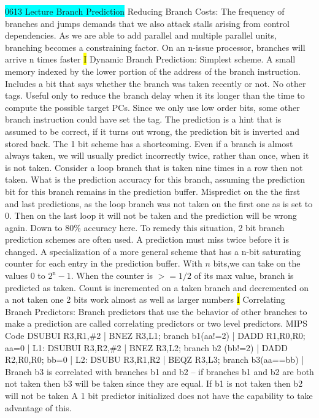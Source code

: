 \documentclass[fontsize=4pt]{scrartcl}
\begin{document}
\colorbox{Cyan}{0613 Lecture Branch Prediction} Reducing Branch Costs: The frequency of branches and jumps demands that we also attack stalls arising from control dependencies. As we are able to add parallel and multiple parallel units, branching becomes a constraining factor. On an n-issue processor, branches will arrive n times faster
\hl{I}
Dynamic Branch Prediction: Simplest scheme. A small memory indexed by the lower portion of the address of the branch instruction. Includes a bit that says whether the branch was taken recently or not. No other tags. Useful only to reduce the branch delay when it its longer than the time to compute the possible target PCs. Since we only use low order bits, some other branch instruction could have set the tag. The prediction is a hint that is assumed to be correct, if it turns out wrong, the prediction bit is inverted and stored back. The 1 bit scheme has a shortcoming. Even if a branch is almost always taken, we will usually predict incorrectly twice, rather than once, when it is not taken. Consider a loop branch that is taken nine times in a row then not taken.  What is the prediction accuracy for this branch, assuming the prediction bit for this branch remains in the prediction buffer. Mispredict on the the first and last predictions, as the loop branch was not taken on the first one as is set to 0.  Then on the last loop it will not be taken and the prediction will be wrong again. Down to 80\% accuracy here. To remedy this situation, 2 bit branch prediction schemes are often used. A prediction must miss twice before it is changed. A specialization of a more general scheme that has a n-bit saturating counter for each entry in the prediction buffer. With $n$ bits,we can take on the values 0 to $2^{\mathrm{n}}-1$. When the counter is $>=1 / 2$ of its max value, branch is predicted as taken. Count is incremented on a taken branch and decremented on a not taken one 2 bits work almost as well as larger numbers
\hl{I}
Correlating Branch Predictors: Branch predictors that use the behavior of other branches to make a prediction are called correlating predictors or two level predictors. MIPS Code DSUBUI R3,R1,\#2 | BNEZ R3,L1; branch b1(aa!=2) | DADD	R1,R0,R0; aa=0 | L1:	DSUBUI R3,R2,\#2 | BNEZ R3,L2; branch b2 (bb!=2) | DADD R2,R0,R0; bb=0 | L2:	DSUBU R3,R1,R2 | BEQZ R3,L3; branch b3(aa==bb) | Branch b3 is correlated with branches b1 and b2 – if branches b1 and b2 are both not taken then b3 will be taken since they are equal. If b1 is not taken then b2 will not be taken A 1 bit predictor initialized does not have the capability to take advantage of this.
\end{document}
